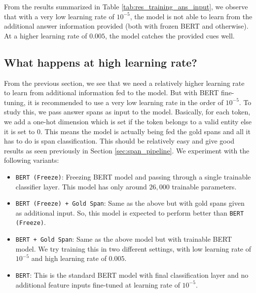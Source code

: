 From the results summarized in Table \ref{tab:res_training_ans_input}, we observe that with a very low learning rate of $10^{-5}$, the model is not able to learn from the additional answer information provided (both with frozen BERT and otherwise). At a higher learning rate of $0.005$, the model catches the provided cues well.

\subsection{What happens at high learning rate?}

From the previous section, we see that we need a relatively higher learning rate to learn from additional information fed to the model. But with BERT fine-tuning, it is recommended to use a very low learning rate in the order of $10^{-5}$. To study this, we pass answer spans as input to the model. Basically, for each token, we add a one-hot dimension which is set if the token belongs to a valid entity else it is set to $0$. This means the model is actually being fed the gold spans and all it has to do is span classification. This should be relatively easy and give good results as seen previously in Section \ref{sec:span_pipeline}. We experiment with the following variants:

\begin{itemize}
    \item \texttt{BERT (Freeze)}: Freezing BERT model and passing through a single trainable classifier layer. This model has only around $26,000$ trainable parameters. 
    
    \item \texttt{BERT (Freeze) + Gold Span}: Same as the above but with gold spans given as additional input. So, this model is expected to perform better than \texttt{BERT (Freeze)}.
    
    \item \texttt{BERT + Gold Span}: Same as the above model but with trainable BERT model. We try training this in two different settings, with low learning rate of $10^{-5}$ and high learning rate of $0.005$.
    
    \item \texttt{BERT}: This is the standard BERT model with final classification layer and no additional feature inputs fine-tuned at learning rate of $10^{-5}$.
\end{itemize}

